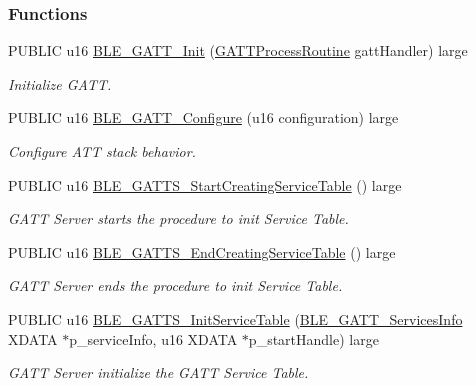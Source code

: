 \subsubsection*{Functions}
\begin{DoxyCompactItemize}
\item 
P\+U\+B\+L\+IC u16 \hyperlink{group___b_l_e___g_a_t_t_ga6924bc2183f639db2d41f74ded2b6da3}{B\+L\+E\+\_\+\+G\+A\+T\+T\+\_\+\+Init} (\hyperlink{group___b_l_e___g_a_t_t_ga3b479749f90cd267d7c3a3eea4605ff6}{G\+A\+T\+T\+Process\+Routine} gatt\+Handler) large
\begin{DoxyCompactList}\small\item\em Initialize G\+A\+TT. \end{DoxyCompactList}\item 
P\+U\+B\+L\+IC u16 \hyperlink{group___b_l_e___g_a_t_t_gab8231a728024e0181d21ac2229a4a47e}{B\+L\+E\+\_\+\+G\+A\+T\+T\+\_\+\+Configure} (u16 configuration) large
\begin{DoxyCompactList}\small\item\em Configure A\+TT stack behavior. \end{DoxyCompactList}\item 
P\+U\+B\+L\+IC u16 \hyperlink{group___b_l_e___g_a_t_t_gaced5c2469856c87b1b62b6a3617f55ee}{B\+L\+E\+\_\+\+G\+A\+T\+T\+S\+\_\+\+Start\+Creating\+Service\+Table} () large
\begin{DoxyCompactList}\small\item\em G\+A\+TT Server starts the procedure to init Service Table. \end{DoxyCompactList}\item 
P\+U\+B\+L\+IC u16 \hyperlink{group___b_l_e___g_a_t_t_ga07d152cd88e2ef9cf67bea40aef8ee86}{B\+L\+E\+\_\+\+G\+A\+T\+T\+S\+\_\+\+End\+Creating\+Service\+Table} () large
\begin{DoxyCompactList}\small\item\em G\+A\+TT Server ends the procedure to init Service Table. \end{DoxyCompactList}\item 
P\+U\+B\+L\+IC u16 \hyperlink{group___b_l_e___g_a_t_t_ga226850291e0a9c12c00560437b252dc1}{B\+L\+E\+\_\+\+G\+A\+T\+T\+S\+\_\+\+Init\+Service\+Table} (\hyperlink{struct_b_l_e___g_a_t_t___services_info}{B\+L\+E\+\_\+\+G\+A\+T\+T\+\_\+\+Services\+Info} X\+D\+A\+TA $\ast$p\+\_\+service\+Info, u16 X\+D\+A\+TA $\ast$p\+\_\+start\+Handle) large
\begin{DoxyCompactList}\small\item\em G\+A\+TT Server initialize the G\+A\+TT Service Table. \end{DoxyCompactList}\item 

\end{DoxyCompactItemize}
